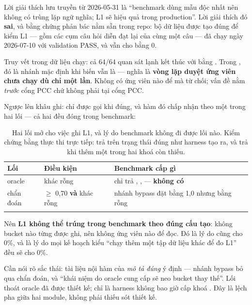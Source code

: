 Lời giải thích lưu truyền từ 2026-05-31 là ``benchmark dùng mẫu độc nhất nên không có trùng
lặp ngữ nghĩa; L1 sẽ hiệu quả trong production''. Lời giải thích đó \textbf{sai}, và bằng
chứng phản bác nằm sẵn trong repo: bộ dữ liệu  được tạo đúng để kiểm
L1 --- gồm các cụm câu hỏi diễn đạt lại của cùng một câu --- đã chạy ngày 2026-07-10 với
validation PASS, và vẫn cho  bằng 0.

Truy vết trong dữ liệu chạy: cả 64/64 quan sát lạnh kết thúc với
 bằng . Trong
, đó là nhánh mặc định khi biến  vẫn là
 --- nghĩa là \textbf{vòng lặp duyệt ứng viên chưa chạy dù chỉ một lần}. Không có
ứng viên nào để mà từ chối; vấn đề nằm \emph{trước} cổng PCC chứ không phải tại cổng PCC.

Ngược lên khâu ghi:  chỉ được gọi khi
 đúng, và hàm đó chấp nhận theo một trong hai lối --- cả hai
đều đóng trong benchmark:

\begin{longtable}{L{3.0cm} L{5.4cm} L{5.6cm}}
\toprule
\textbf{Lối} & \textbf{Điều kiện} & \textbf{Benchmark cấp gì}\\
\midrule
\endhead
oracle &  khác rỗng &  chỉ
trả , ,  --- \textbf{không
có }\\
chẩn đoán &  $\geq$ 0,70 \textbf{và}
 khác rỗng & nhánh bypass đặt  bằng 1,0 nhưng
 bằng rỗng\\
\bottomrule
\caption{Hai lối mở cho việc ghi L1, và lý do benchmark không đi được lối nào. Kiểm chứng
bằng thực thi trực tiếp:  trả  trên trạng thái đúng như
harness tạo ra, và trả  khi thêm một trong hai khoá còn thiếu.}
\end{longtable}

Nên \textbf{L1 không thể trúng trong benchmark theo đúng cấu tạo}: không bucket nào từng
được ghi, nên không ứng viên nào để đọc. Đó là lý do  cũng cho 0\%, và
là lý do mọi kế hoạch kiểu ``chạy thêm một tập dữ liệu khác để đo L1'' đều sẽ cho 0\%.

Cần nói rõ sắc thái: tài liệu nội hàm của  \emph{mô tả đúng} ý định
--- nhánh bypass bỏ qua chẩn đoán, và ``khái niệm do oracle cung cấp sẽ neo bucket thay
thế''. Lối thoát oracle đã được thiết kế; chỉ là harness không bao giờ cấp khoá
. Đây là lệch pha giữa hai module, không phải thiếu sót thiết kế.

